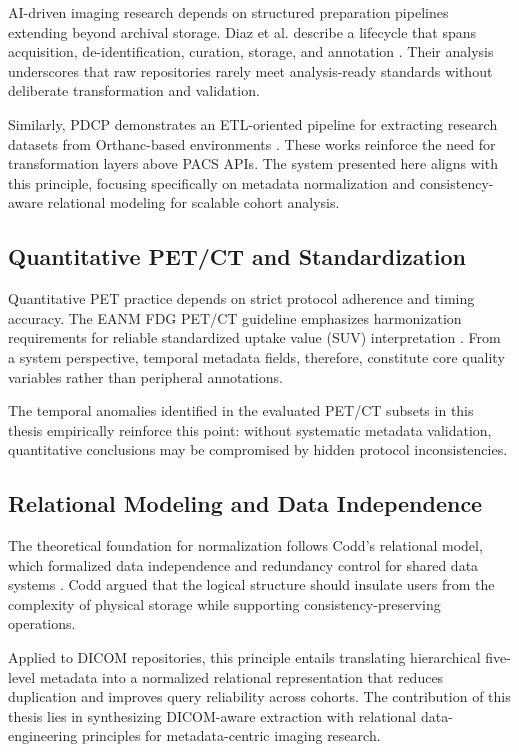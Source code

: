 AI-driven imaging research depends on structured preparation pipelines extending beyond archival storage. Diaz et al. describe a lifecycle that spans acquisition, de-identification, curation, storage, and annotation \cite{DIAZ202125}. Their analysis underscores that raw repositories rarely meet analysis-ready standards without deliberate transformation and validation.

Similarly, PDCP demonstrates an ETL-oriented pipeline for extracting research datasets from Orthanc-based environments \cite{software1020009}. These works reinforce the need for transformation layers above PACS APIs. The system presented here aligns with this principle, focusing specifically on metadata normalization and consistency-aware relational modeling for scalable cohort analysis.

\subsection{Quantitative PET/CT and Standardization}

Quantitative PET practice depends on strict protocol adherence and timing accuracy. The EANM FDG PET/CT guideline emphasizes harmonization requirements for reliable standardized uptake value (SUV) interpretation \cite{suv}. From a system perspective, temporal metadata fields, therefore, constitute core quality variables rather than peripheral annotations.

The temporal anomalies identified in the evaluated PET/CT subsets in this thesis empirically reinforce this point: without systematic metadata validation, quantitative conclusions may be compromised by hidden protocol inconsistencies.

\subsection{Relational Modeling and Data Independence}

The theoretical foundation for normalization follows Codd's relational model, which formalized data independence and redundancy control for shared data systems \cite{codd}. Codd argued that the logical structure should insulate users from the complexity of physical storage while supporting consistency-preserving operations.

Applied to DICOM repositories, this principle entails translating hierarchical five-level metadata into a normalized relational representation that reduces duplication and improves query reliability across cohorts. The contribution of this thesis lies in synthesizing DICOM-aware extraction with relational data-engineering principles for metadata-centric imaging research.